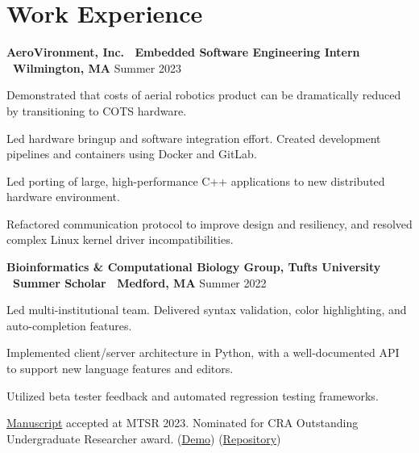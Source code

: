 \documentclass[letter,10pt]{article}
\newenvironment{mylist}[1][]
    {\itemize[nosep, wide=0pt, leftmargin=*, after=\strut]}
    {\enditemize}
\begin{document}

\section{Work Experience}
\begin{minipage}[t]{\linewidth}
    \textbf{AeroVironment, Inc. \textbar \ Embedded Software Engineering Intern \textbar \ Wilmington, MA} \hfill Summer 2023 
    \begin{mylist}
        \item Demonstrated that costs of aerial robotics product can be dramatically reduced by transitioning to COTS hardware. 
        \item Led hardware bringup and software integration effort. Created development pipelines and containers using Docker and GitLab. 
        \item Led porting of large, high-performance C++ applications to new distributed hardware environment. 
        \item Refactored communication protocol to improve design and resiliency, and resolved complex Linux kernel driver incompatibilities.
    \end{mylist}
\end{minipage}


\begin{minipage}[t]{\linewidth}
    \textbf{Bioinformatics \& Computational Biology Group, Tufts University \textbar \ Summer Scholar \textbar \ Medford, MA} \hfill Summer 2022
    \begin{mylist}
        \item Led multi-institutional team. Delivered syntax validation, color highlighting, and auto-completion features.
        \item Implemented client/server architecture in Python, with a well-documented API to support new language features and editors. 
        \item Utilized beta tester feedback and automated regression testing frameworks.
        \item \href{https://www.eecs.tufts.edu/~lstran01/files/context-sensitive.pdf}{Manuscript} accepted at MTSR 2023. Nominated for CRA Outstanding Undergraduate Researcher award. (\href{https://youtu.be/TFLdXxnaBlU}{Demo}) (\href{https://github.com/liam-strand/medford-language-server}{Repository})
    \end{mylist}
\end{minipage}
\end{document}
